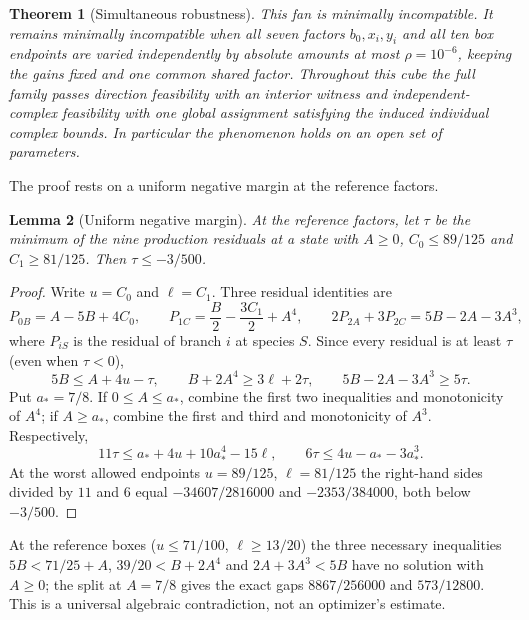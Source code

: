 \documentclass[11pt,a4paper]{article}
\theoremstyle{plain}
\newtheorem{theorem}{Theorem}[section]
\newtheorem{lemma}[theorem]{Lemma}
\theoremstyle{definition}
\theoremstyle{remark}
\begin{document}
\begin{theorem}[Simultaneous robustness]\label{thm:robust}
This fan is minimally incompatible. It remains minimally incompatible when all seven factors $b_0,x_i,y_i$ and all ten box endpoints are varied independently by absolute amounts at most $\rho=10^{-6}$, keeping the gains fixed and one common shared factor. Throughout this cube the full family passes direction feasibility with an interior witness and independent-complex feasibility with one global assignment satisfying the induced individual complex bounds. In particular the phenomenon holds on an open set of parameters.
\end{theorem}

The proof rests on a uniform negative margin at the reference factors.

\begin{lemma}[Uniform negative margin]\label{lem:margin}
At the reference factors, let $\tau$ be the minimum of the nine production residuals at a state with $A\ge0$, $C_0\le89/125$ and $C_1\ge81/125$. Then $\tau\le-3/500$.
\end{lemma}
\begin{proof}
Write $u=C_0$ and $\ell=C_1$. Three residual identities are
\[
P_{0B}=A-5B+4C_0,\qquad P_{1C}=\frac B2-\frac{3C_1}{2}+A^4,\qquad 2P_{2A}+3P_{2C}=5B-2A-3A^3 ,
\]
where $P_{iS}$ is the residual of branch $i$ at species $S$. Since every residual is at least $\tau$ (even when $\tau<0$),
\[
5B\le A+4u-\tau,\qquad B+2A^4\ge3\ell+2\tau,\qquad 5B-2A-3A^3\ge5\tau .
\]
Put $a_*=7/8$. If $0\le A\le a_*$, combine the first two inequalities and monotonicity of $A^4$; if $A\ge a_*$, combine the first and third and monotonicity of $A^3$. Respectively,
\[
11\tau\le a_*+4u+10a_*^4-15\ell,\qquad 6\tau\le4u-a_*-3a_*^3 .
\]
At the worst allowed endpoints $u=89/125$, $\ell=81/125$ the right-hand sides divided by $11$ and $6$ equal $-34607/2816000$ and $-2353/384000$, both below $-3/500$.
\end{proof}

At the reference boxes ($u\le71/100$, $\ell\ge13/20$) the three necessary inequalities $5B<71/25+A$, $39/20<B+2A^4$ and $2A+3A^3<5B$ have no solution with $A\ge0$; the split at $A=7/8$ gives the exact gaps $8867/256000$ and $573/12800$. This is a universal algebraic contradiction, not an optimizer's estimate.
\end{document}
